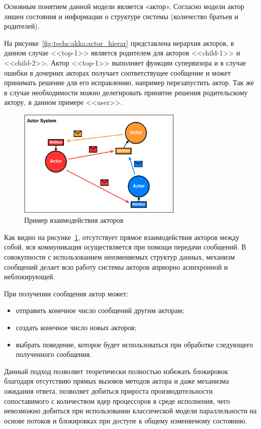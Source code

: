 Основным понятием данной модели является «актор». Согласно модели актор лишен состояния и информации о структуре системы (количество братьев и родителей).

На рисунке~\ref{fig:techs:akka:actor_hierar} представлена иерархия акторов, в данном случае <<top-1>> является родителем для акторов <<child-1>> и <<child-2>>. Актор <<top-1>> выполняет функции супервизора и в случае ошибки в дочерних акторах получает соответствущее сообщение и может принимать решение для его исправлению, например перезапустить актор. Так же в случае необходимости можно делегировать принятие решения родительскому актору, в данном примере <<user>>.
\begin{figure}[ht]
    \centering
    \includegraphics[width=0.7\textwidth]{figures/actor_model.png}
    \caption{Пример взаимодействия акторов}
    \label{fig:techs:akka:actor_model:comulication}
\end{figure}

Как видно на рисунке~\ref{fig:techs:akka:actor_model:comulication}, отсутствует прямое взаимодействия акторов между собой, вся коммуникация осуществляется при помощи передачи сообщений. В совокупности с использованием неизменяемых структур данных, механизм сообщений делает всю работу системы акторов априорно асинхронной и неблокирующей.

При получении сообщения актор может:
\begin{itemize}
  \item отправить конечное число сообщений другим акторам;
  \item создать конечное число новых акторов;
  \item выбрать поведение, которое будет использоваться при обработке следующего полученного сообщения.
\end{itemize}

Данный подход позволяет теоретически полностью избежать блокировок благодаря отсутствию прямых вызовов методов актора и даже механизма ожидания ответа, позволяет добиться прироста производительности сопоставимого с количеством ядер процессоров в среде исполнения, чего невозможно добиться при использовании классической модели параллельности на основе потоков и блокировках при доступе к общему изменяемому состоянию.

